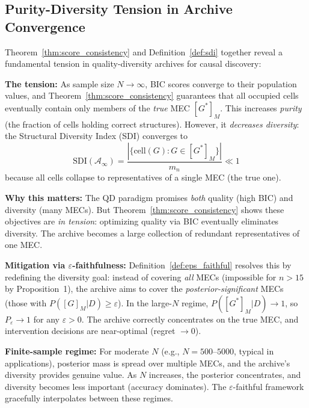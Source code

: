 \documentclass{article}
\theoremstyle{definition}
\theoremstyle{plain}
\theoremstyle{remark}
\begin{document}
\subsection{Purity-Diversity Tension in Archive Convergence}
\label{subsec:purity_diversity_tension}

Theorem~\ref{thm:score_consistency} and Definition~\ref{def:sdi} together reveal
a fundamental tension in quality-diversity archives for causal discovery:

\textbf{The tension:} As sample size $N \to \infty$, BIC scores converge to their
population values, and Theorem~\ref{thm:score_consistency} guarantees that all
occupied cells eventually contain only members of the \emph{true} MEC $[G^*]_M$.
This increases \emph{purity} (the fraction of cells holding correct structures).
However, it \emph{decreases diversity}: the Structural Diversity Index (SDI) converges to
\begin{equation}
\mathrm{SDI}(\mathcal{A}_\infty) = \frac{|\{\text{cell}(G) : G \in [G^*]_M\}|}{m_n} \ll 1
\end{equation}
because all cells collapse to representatives of a single MEC (the true one).

\textbf{Why this matters:} The QD paradigm promises \emph{both} quality (high BIC)
and diversity (many MECs). But Theorem~\ref{thm:score_consistency} shows these
objectives are \emph{in tension}: optimizing quality via BIC eventually eliminates
diversity. The archive becomes a large collection of redundant representatives of
one MEC.

\textbf{Mitigation via $\varepsilon$-faithfulness:} Definition~\ref{def:eps_faithful}
resolves this by redefining the diversity goal: instead of covering \emph{all}
MECs (impossible for $n > 15$ by Proposition~1), the archive aims to cover the
\emph{posterior-significant} MECs (those with $P([G]_M | D) \geq \varepsilon$).
In the large-$N$ regime, $P([G^*]_M | D) \to 1$, so $P_\varepsilon \to 1$ for
any $\varepsilon > 0$. The archive correctly concentrates on the true MEC, and
intervention decisions are near-optimal (regret $\to 0$).

\textbf{Finite-sample regime:} For moderate $N$ (e.g., $N = 500$--$5000$, typical
in applications), posterior mass is spread over multiple MECs, and the archive's
diversity provides genuine value. As $N$ increases, the posterior concentrates,
and diversity becomes less important (accuracy dominates). The $\varepsilon$-faithful
framework gracefully interpolates between these regimes.
\end{document}
